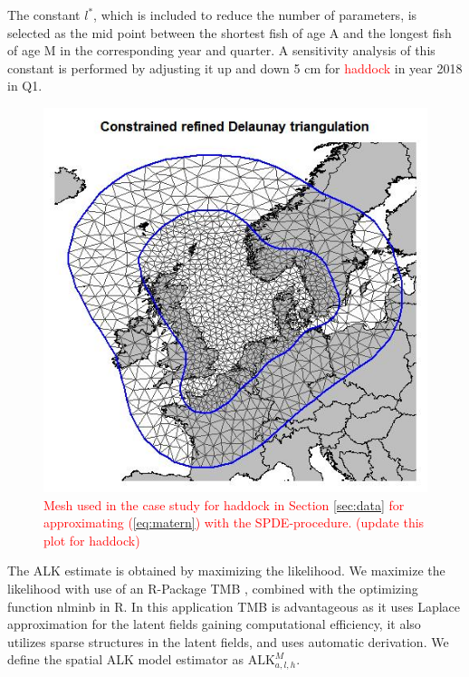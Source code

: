 \documentclass[a4paper 12pt]{article}
\numberwithin{equation}{section}
\newcommand{\ed}[1]{\textcolor{red}{#1}}
\begin{document}
The constant $l^*$, which is included to reduce the number of parameters, is selected as the mid point between the shortest fish of age A and the longest fish of age M in the corresponding year and quarter.  A sensitivity analysis of this constant is performed by adjusting it up and down 5 cm for \ed{haddock} in year 2018 in Q1. 

\begin{figure}[h!]
\begin{center}
\includegraphics[scale=0.5]{figures/mesh.jpeg}
 \caption{\ed{Mesh used in the case study for haddock in Section \ref{sec:data} for approximating (\ref{eq:matern}) with the SPDE-procedure. (update this plot for haddock)}}\label{fig:mesh}
\end{center}
\end{figure}
\noindent The ALK estimate is obtained by maximizing the likelihood. We maximize the likelihood with use of an R-Package {\sffamily TMB} \citep{kristensen2015tmb}, combined with the optimizing function {\sffamily nlminb} in R. In this application {\sffamily TMB} is advantageous as it uses Laplace approximation for the latent fields gaining computational efficiency, it also utilizes sparse structures in the latent fields, and uses automatic derivation. We define the spatial ALK model estimator as $\mathrm{ALK}_{a,l,h}^{M}$.
\end{document}
